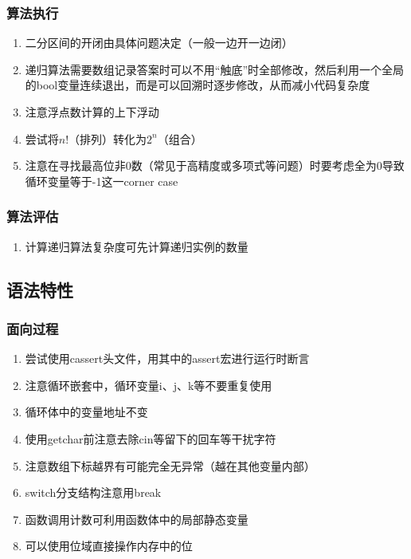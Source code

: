 \documentclass[onecolumn]{article}
\begin{document}
        \subsubsection{算法执行}
            \noindent
            \begin{enumerate}
                \item 二分区间的开闭由具体问题决定（一般一边开一边闭）
                \item 递归算法需要数组记录答案时可以不用“触底”时全部修改，然后利用一个全局的bool变量连续退出，而是可以回溯时逐步修改，从而减小代码复杂度
                \item 注意浮点数计算的上下浮动
                \item 尝试将$n!$（排列）转化为$2^n$（组合）
                \item 注意在寻找最高位非0数（常见于高精度或多项式等问题）时要考虑全为0导致循环变量等于-1这一corner case
            \end{enumerate}
        \subsubsection{算法评估}
            \noindent
            \begin{enumerate}
                \item 计算递归算法复杂度可先计算递归实例的数量
            \end{enumerate}
    \subsection{语法特性}
        \subsubsection{面向过程}
            \noindent
            \begin{enumerate}
                \item 尝试使用cassert头文件，用其中的assert宏进行运行时断言
                \item 注意循环嵌套中，循环变量i、j、k等不要重复使用
                \item 循环体中的变量地址不变
                \item 使用getchar前注意去除cin等留下的回车等干扰字符
                \item 注意数组下标越界有可能完全无异常（越在其他变量内部）
                \item switch分支结构注意用break
                \item 函数调用计数可利用函数体中的局部静态变量
                \item 可以使用位域直接操作内存中的位
            \end{enumerate}
\end{document}
